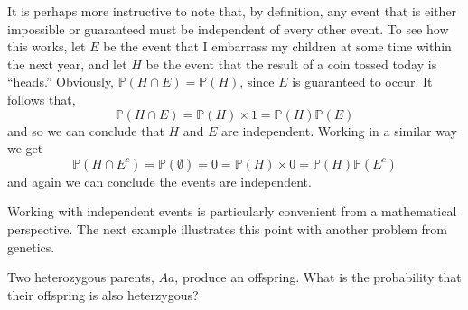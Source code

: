 \documentclass[../book.tex]{subfiles}
\begin{document}
It is perhaps more instructive to note that, by definition, any event that is either impossible or guaranteed must be independent of every other event. To see how this works, let \(E\) be the event that I embarrass my children at some time within the next year, and let \(H\) be the event that the result of a coin tossed today is ``heads.'' Obviously, \(\mathbb{P}( H \cap E ) = \mathbb{P} (H)\),
since \(E\) is guaranteed to occur. It follows that,
\begin{equation}\label{eq:prob-20}
\mathbb{P}( H \cap E ) = \mathbb{P} (H) \times 1 = \mathbb{P}(H)  \mathbb{P}(E)
\end{equation}
and so we can conclude that \(H\) and \(E\) are independent. Working in a similar way we get
\begin{equation}\label{eq:prob-21}
\mathbb{P}( H \cap E^c ) = \mathbb{P} ( \emptyset ) = 0 = \mathbb{P}(H) \times 0 = \mathbb{P}(H)  \mathbb{P}(E^c)
\end{equation}
and again we can conclude the events are independent.

Working with independent events is particularly convenient from a mathematical perspective. The next example illustrates this point with another problem from genetics.

\begin{example} \label{eg:offsprings}
Two heterozygous parents, \(Aa\), produce an offspring. What is the probability that their offspring is also heterzygous?
\end{example}
\end{document}
